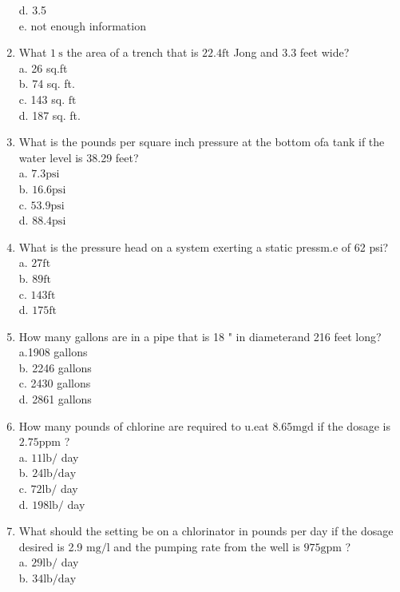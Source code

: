 \begin{enumerate}
d. 3.5\\
e. not enough information\\
\item What $1 \mathrm{~s}$ the area of a trench that is $22.4 \mathrm{ft}$ Jong and 3.3 feet wide?\\
a. 26 sq.ft\\
b. 74 sq. ft.\\
c. 143 sq. $\mathrm{ft}$\\
d. 187 sq. ft.
\item What is the pounds per square inch pressure at the bottom ofa tank if the water level is 38.29 feet?\\
a. $7.3 \mathrm{psi}$\\
b. $16.6 \mathrm{psi}$\\
c. $53.9 \mathrm{psi}$\\
d. $88.4 \mathrm{psi}$\\
\item What is the pressure head on a system exerting a static pressm.e of 62 psi?\\
a. $27 \mathrm{ft}$\\
b. $89 \mathrm{ft}$\\
c. $143 \mathrm{ft}$\\
d. $175 \mathrm{ft}$\\
\item How many gallons are in a pipe that is 18 " in diameterand 216 feet long?\\
a.1908 gallons\\
b. 2246 gallons\\
c. 2430 gallons\\
d. 2861 gallons\\
\item How many pounds of chlorine are required to u.eat $8.65 \mathrm{mgd}$ if the dosage is $2.75 \mathrm{ppm}$ ?\\
a. $11 \mathrm{lb} /$ day\\
b. $24 \mathrm{lb} / \mathrm{day}$\\
c. $72 \mathrm{lb} /$ day\\
d. $198 \mathrm{lb} /$ day\\
\item What should the setting be on a chlorinator in pounds per day if the dosage desired is 2.9 $\mathrm{mg} / \mathrm{l}$ and the pumping rate from the well is $975 \mathrm{gpm}$ ?\\
a. $29 \mathrm{lb} /$ day\\
b. $34 \mathrm{lb} / \mathrm{day}$\\

\end{enumerate}
